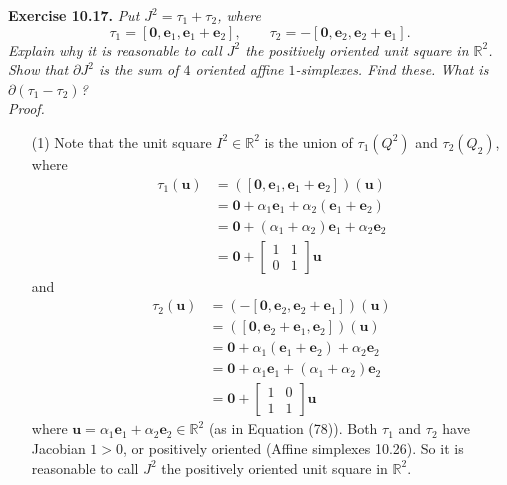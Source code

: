 \documentclass{article}
\begin{document}



\textbf{Exercise 10.17.}
\emph{Put $J^2 = \tau_1 + \tau_2$, where
\[
  \tau_1 = [\mathbf{0}, \mathbf{e}_1, \mathbf{e}_1+\mathbf{e}_2],
  \qquad
  \tau_2 = -[\mathbf{0}, \mathbf{e}_2, \mathbf{e}_2+\mathbf{e}_1].
\]
Explain why it is reasonable to call $J^2$ the positively oriented unit square in $\mathbb{R}^2$.
Show that $\partial J^2$ is the sum of $4$ oriented affine $1$-simplexes.
Find these.
What is $\partial(\tau_1 - \tau_2)$?} \\



\emph{Proof.}
\begin{enumerate}
\item[(1)]
  Note that the unit square $I^2 \in \mathbb{R}^2$ is the union of
  $\tau_1(Q^2)$ and $\tau_2(Q_2)$, where
  \begin{align*}
    \tau_1(\mathbf{u})
    &= ([\mathbf{0}, \mathbf{e}_1, \mathbf{e}_1+\mathbf{e}_2])(\mathbf{u}) \\
    &= \mathbf{0} + \alpha_1 \mathbf{e}_1 + \alpha_2 (\mathbf{e}_1+\mathbf{e}_2) \\
    &= \mathbf{0} + (\alpha_1+\alpha_2) \mathbf{e}_1 + \alpha_2 \mathbf{e}_2 \\
    &= \mathbf{0} +
      \begin{bmatrix}
        1 & 1 \\
        0 & 1
      \end{bmatrix}
      \mathbf{u}
  \end{align*}
  and
  \begin{align*}
    \tau_2(\mathbf{u})
    &= (-[\mathbf{0}, \mathbf{e}_2, \mathbf{e}_2+\mathbf{e}_1])(\mathbf{u}) \\
    &= ([\mathbf{0}, \mathbf{e}_2+\mathbf{e}_1, \mathbf{e}_2])(\mathbf{u}) \\
    &= \mathbf{0} + \alpha_1 (\mathbf{e}_1+\mathbf{e}_2) + \alpha_2 \mathbf{e}_2 \\
    &= \mathbf{0} + \alpha_1 \mathbf{e}_1 + (\alpha_1+\alpha_2) \mathbf{e}_2 \\
    &= \mathbf{0} +
      \begin{bmatrix}
        1 & 0 \\
        1 & 1
      \end{bmatrix}
      \mathbf{u}
  \end{align*}
  where $\mathbf{u} = \alpha_1 \mathbf{e}_1 + \alpha_2 \mathbf{e}_2 \in \mathbb{R}^2$
  (as in Equation (78)).
  Both $\tau_1$ and $\tau_2$ have Jacobian $1 > 0$, or positively oriented
  (Affine simplexes 10.26).
  So it is reasonable to call $J^2$ the positively oriented unit square in $\mathbb{R}^2$.


\end{enumerate}
\end{document}
